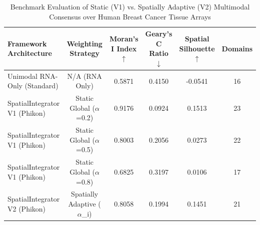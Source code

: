 \begin{table}[t]
\centering
\caption{Benchmark Evaluation of Static (V1) vs. Spatially Adaptive (V2) Multimodal Consensus over Human Breast Cancer Tissue Arrays}
\label{tab:v2_adaptive_consensus}
\begin{tabular}{l c c c c c}
\toprule
\textbf{Framework Architecture} & \textbf{Weighting Strategy} & \textbf{Moran's I Index $\uparrow$} & \textbf{Geary's C Ratio $\downarrow$} & \textbf{Spatial Silhouette $\uparrow$} & \textbf{Domains} \\
\midrule
Unimodal RNA-Only (Standard) & N/A (RNA Only) & 0.5871 & 0.4150 & -0.0541 & 16 \\
SpatialIntegrator V1 (Phikon) & Static Global ($\alpha$=0.2) & 0.9176 & 0.0924 & 0.1513 & 23 \\
SpatialIntegrator V1 (Phikon) & Static Global ($\alpha$=0.5) & 0.8003 & 0.2056 & 0.0273 & 22 \\
SpatialIntegrator V1 (Phikon) & Static Global ($\alpha$=0.8) & 0.6825 & 0.3197 & 0.0106 & 17 \\
SpatialIntegrator V2 (Phikon) & Spatially Adaptive ($\alpha$_i) & 0.8058 & 0.1994 & 0.1451 & 21 \\
\bottomrule
\end{tabular}
\end{table}
